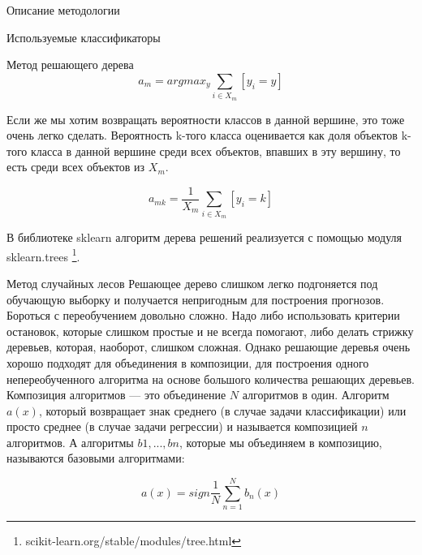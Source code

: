 \begin{section}{Описание методологии}
\begin{subsection}{Используемые классификаторы}
\begin{subsubsection}{Метод решающего дерева}
	\begin{equation}
	a_m = arg⁡max_{y}  \sum\limits_{i \in X_m} [y_i = y]
	\end{equation}

	Если же мы хотим возвращать вероятности классов в данной вершине, это тоже очень легко сделать. Вероятность k-того класса оценивается как доля объектов k-того класса в данной вершине среди всех объектов, впавших в эту вершину, то есть среди всех объектов из $X_m$.

	\begin{equation}
	a_{mk} = \frac{1}{X_m}  \sum\limits_{i \in X_m} [y_i = k]
	\end{equation}

  В библиотеке sklearn алгоритм дерева решений реализуется с помощью модуля sklearn.trees \footnote{scikit-learn.org/stable/modules/tree.html}.
    \end{subsubsection}

    \begin{subsubsection}{Метод случайных лесов}
      Решающее дерево слишком легко подгоняется под обучающую выборку и получается непригодным для построения прогнозов. Бороться с переобучением довольно сложно. Надо либо использовать критерии остановок, которые слишком простые и не всегда помогают, либо делать стрижку деревьев, которая, наоборот, слишком сложная. Однако решающие деревья очень хорошо подходят для объединения в композиции, для построения одного непереобученного алгоритма на основе большого количества решающих деревьев. Композиция алгоритмов — это объединение $N$ алгоритмов в один. Алгоритм $a(x)$, который возвращает знак среднего (в случае задачи классификации) или просто среднее (в случае задачи регрессии) и называется композицией $n$ алгоритмов. А алгоритмы $b1, ..., bn$, которые мы объединяем в композицию, называются базовыми алгоритмами:

		\begin{equation}
		a(x) = sign \frac{1}{N}  \sum\limits_{n=1}^N b_n(x)
		\end{equation}


\end{subsubsection}
\end{subsection}
\end{section}
